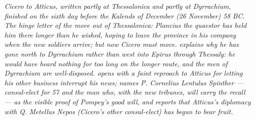
\textit{Cicero to Atticus, written partly at Thessalonica and
partly at Dyrrachium, finished on the sixth day before the
Kalends of December (26 November) 58 BC. The hinge letter of
the move out of Thessalonica: Plancius the quaestor has held
him there longer than he wished, hoping to leave the province
in his company when the new soldiers arrive; but now Cicero
must move.  explains why he has gone north to
Dyrrachium rather than west into Epirus through Thessaly: he
would have heard nothing for too long on the longer route, and
the men of Dyrrachium are well-disposed. 
opens with a faint reproach to Atticus for letting his other
business interrupt his news;  names P. Cornelius
Lentulus Spinther --- consul-elect for 57 and the man who, with
the new tribunes, will carry the recall --- as the visible
proof of Pompey's good will, and reports that Atticus's
diplomacy with Q. Metellus Nepos (Cicero's other consul-elect)
has begun to bear fruit.}
